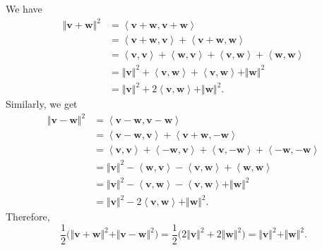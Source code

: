 \documentclass[12pt]{article}
\begin{document}
We have
	\begin{align*}
		\Vert \mathbf{v} + \mathbf{w} \Vert^2 &= \left\langle \mathbf{v} + \mathbf{w} , \mathbf{v} + \mathbf{w} \right\rangle \\ 
		&= \left\langle \mathbf{v} + \mathbf{w} , \mathbf{v} \right\rangle + \left\langle \mathbf{v} + \mathbf{w} , \mathbf{w} \right\rangle \\ 
		&= \left\langle \mathbf{v} , \mathbf{v} \right\rangle + \left\langle \mathbf{w} , \mathbf{v} \right\rangle + \left\langle \mathbf{v} , \mathbf{w} \right\rangle + \left\langle \mathbf{w} , \mathbf{w} \right\rangle \\ 
		&= \Vert \mathbf{v} \Vert^2 + \left\langle \mathbf{v} , \mathbf{w} \right\rangle + \left\langle \mathbf{v} , \mathbf{w} \right\rangle + \Vert \mathbf{w} \Vert^2 \\ 
		&= \Vert \mathbf{v} \Vert^2 + 2 \left\langle \mathbf{v} , \mathbf{w} \right\rangle + \Vert \mathbf{w} \Vert^2 .
	\end{align*}
Similarly, we get
	\begin{align*}
		\Vert \mathbf{v} - \mathbf{w} \Vert^2 &= \left\langle \mathbf{v} - \mathbf{w} , \mathbf{v} - \mathbf{w} \right\rangle \\ 
		&= \left\langle \mathbf{v} - \mathbf{w} , \mathbf{v} \right\rangle + \left\langle \mathbf{v} + \mathbf{w} , -\mathbf{w} \right\rangle \\ 
		&= \left\langle \mathbf{v} , \mathbf{v} \right\rangle + \left\langle -\mathbf{w} , \mathbf{v} \right\rangle + \left\langle \mathbf{v} , -\mathbf{w} \right\rangle + \left\langle -\mathbf{w} , -\mathbf{w} \right\rangle \\ 
		&= \Vert \mathbf{v} \Vert^2 - \left\langle \mathbf{w} , \mathbf{v} \right\rangle - \left\langle \mathbf{v} , \mathbf{w} \right\rangle + \left\langle \mathbf{w} , \mathbf{w} \right\rangle \\
		&= \Vert \mathbf{v} \Vert^2 - \left\langle \mathbf{v} , \mathbf{w} \right\rangle - \left\langle \mathbf{v} , \mathbf{w} \right\rangle + \Vert \mathbf{w} \Vert^2 \\ 
		&= \Vert \mathbf{v} \Vert^2 - 2 \left\langle \mathbf{v} , \mathbf{w} \right\rangle + \Vert \mathbf{w} \Vert^2 .
	\end{align*}
Therefore,
	\[
		\frac{1}{2} \Big( \Vert \mathbf{v} + \mathbf{w} \Vert^2 + \Vert \mathbf{v} - \mathbf{w} \Vert^2 \Big) = \frac{1}{2} \Big( 2 \Vert \mathbf{v} \Vert^2 + 2\Vert \mathbf{w} \Vert^2 \Big) = \Vert \mathbf{v} \Vert^2 + \Vert \mathbf{w} \Vert^2 .
	\]
\end{document}
